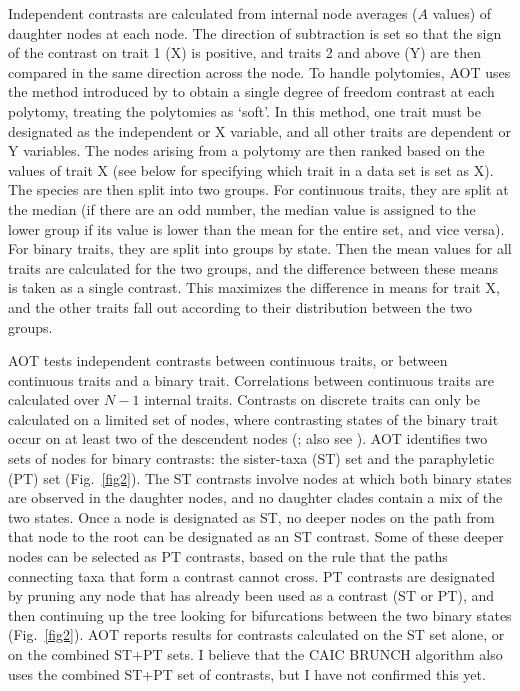 \documentclass[12pt,letterpaper]{article}
\begin{document}
Independent contrasts are calculated from internal node averages ($A$
values) of daughter nodes at each node. The direction of subtraction
is set so that the sign of the contrast on trait 1 (X) is positive,
and traits 2 and above (Y) are then compared in the same direction
across the node. To handle polytomies, AOT uses the method introduced
by \citet{pagel1992met} to obtain a single degree of freedom contrast at each
polytomy, treating the polytomies as `soft'. In this method, one trait must be designated as the
independent or X variable, and all other traits are dependent or Y
variables. The nodes arising from a polytomy are then ranked based on
the values of trait X (see below for specifying which trait in a data
set is set as X). The species are then split into two groups. For
continuous traits, they are split at the median (if there are an odd
number, the median value is assigned to the lower group if its value
is lower than the mean for the entire set, and vice versa). For binary
traits, they are split into groups by state. Then the mean values for
all traits are calculated for the two groups, and the difference
between these means is taken as a single contrast. This maximizes the
difference in means for trait X, and the other traits fall out
according to their distribution between the two groups.

AOT tests independent contrasts between continuous traits, or between
continuous traits and a binary trait. Correlations between continuous
traits are calculated over $N-1$ internal traits. Contrasts on
discrete traits can only be calculated on a limited set of nodes,
where contrasting states of the binary trait occur on at least two of
the descendent nodes (\citealt{purvis2003com}; also see
\citealp{maddison2000tes}). AOT identifies two sets of nodes for
binary contrasts: the sister-taxa (ST) set and the paraphyletic (PT)
set (Fig.~\ref{fig2}). The ST contrasts involve nodes at which both
binary states are observed in the daughter nodes, and no daughter
clades contain a mix of the two states. Once a node is designated as
ST, no deeper nodes on the path from that node to the root can be
designated as an ST contrast.  Some of these deeper nodes can be
selected as PT contrasts, based on the rule that the paths connecting
taxa that form a contrast cannot cross. PT contrasts are designated by
pruning any node that has already been used as a contrast (ST or PT),
and then continuing up the tree looking for bifurcations between the
two binary states (Fig.~\ref{fig2}). AOT reports results for contrasts
calculated on the ST set alone, or on the combined ST+PT sets. I
believe that the CAIC BRUNCH algorithm \citep{purvis2003com} also uses
the combined ST+PT set of contrasts, but I have not confirmed this
yet.
\end{document}
